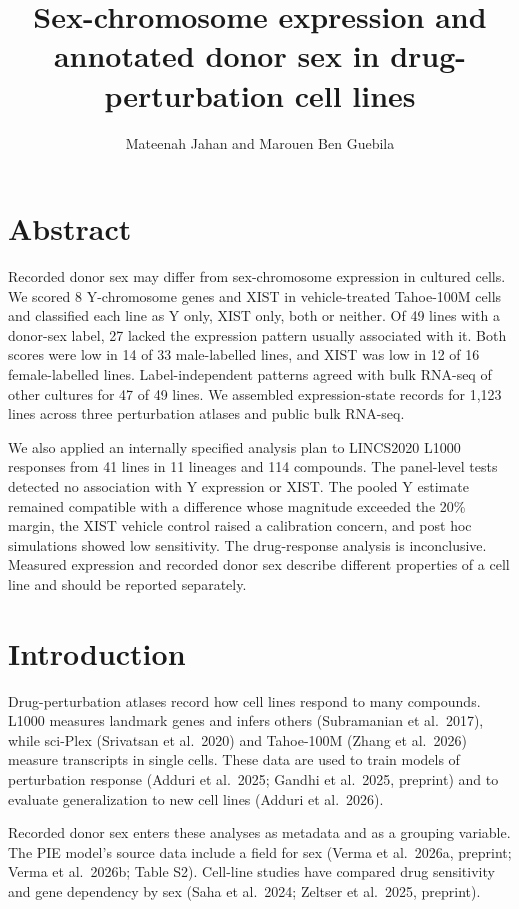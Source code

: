 \documentclass[
  11pt,
  letterpaper,
]{article}
\title{Sex-chromosome expression and annotated donor sex in
drug-perturbation cell lines}
\author{Mateenah Jahan and Marouen Ben Guebila}
\date{}
\begin{document}
\maketitle

\section*{Abstract}\label{abstract}

Recorded donor sex may differ from sex-chromosome expression in cultured
cells. We scored 8 Y-chromosome genes and XIST in vehicle-treated
Tahoe-100M cells and classified each line as Y only, XIST only, both or
neither. Of 49 lines with a donor-sex label, 27 lacked the expression
pattern usually associated with it. Both scores were low in 14 of 33
male-labelled lines, and XIST was low in 12 of 16 female-labelled lines.
Label-independent patterns agreed with bulk RNA-seq of other cultures
for 47 of 49 lines. We assembled expression-state records for 1,123
lines across three perturbation atlases and public bulk RNA-seq.

We also applied an internally specified analysis plan to LINCS2020 L1000
responses from 41 lines in 11 lineages and 114 compounds. The
panel-level tests detected no association with Y expression or XIST. The
pooled Y estimate remained compatible with a difference whose magnitude
exceeded the 20\% margin, the XIST vehicle control raised a calibration
concern, and post hoc simulations showed low sensitivity. The
drug-response analysis is inconclusive. Measured expression and recorded
donor sex describe different properties of a cell line and should be
reported separately.

\section{Introduction}\label{introduction}

Drug-perturbation atlases record how cell lines respond to many
compounds. L1000 measures landmark genes and infers others (Subramanian
et al.~2017), while sci-Plex (Srivatsan et al.~2020) and Tahoe-100M
(Zhang et al.~2026) measure transcripts in single cells. These data are
used to train models of perturbation response (Adduri et al.~2025;
Gandhi et al.~2025, preprint) and to evaluate generalization to new cell
lines (Adduri et al.~2026).

Recorded donor sex enters these analyses as metadata and as a grouping
variable. The PIE model's source data include a field for sex (Verma et
al.~2026a, preprint; Verma et al.~2026b; Table S2). Cell-line studies
have compared drug sensitivity and gene dependency by sex (Saha et
al.~2024; Zeltser et al.~2025, preprint).
\end{document}
